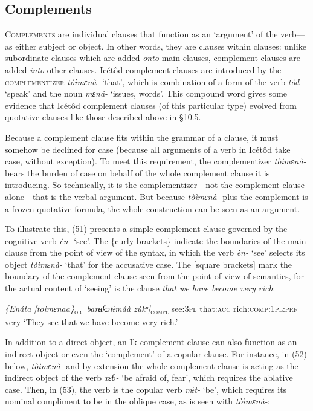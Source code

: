 \subsection{Complements}


\textsc{Complements} are individual clauses that function as an ‘argument’\textsc{} of the verb—as either subject or object. In other words, they are clauses within clauses: unlike subordinate clauses which are added \textit{onto} main clauses, complement clauses are added \textit{into} other clauses. Icétôd complement clauses are introduced by the \textsc{complementizer} \textit{tòìmɛnà-} ‘that’, which is combination of a form of the verb \textit{tód-} ‘speak’ and the noun \textit{mɛná-} ‘issues, words’. This compound word gives some evidence that Icétôd complement clauses (of this particular type) evolved from quotative clauses like those described above in §10.5.

Because a complement clause fits within the grammar of a clause, it must somehow be declined for case (because all arguments of a verb in Icétôd take case, without exception). To meet this requirement, the complementizer \textit{tòìmɛnà-} bears the burden of case on behalf of the whole complement clause it is introducing. So technically, it is the complementizer—not the complement clause alone—that is the verbal argument. But because \textit{tòìmɛnà-} plus the complement is a frozen quotative formula, the whole construction can be seen as an argument.

To illustrate this, (51) presents a simple complement clause governed by the cognitive verb \textit{èn-} ‘see’. The \{curly brackets\} indicate the boundaries of the main clause from the point of view of the syntax, in which the verb \textit{èn-} ‘see’ selects its object \textit{tòìmɛnà-} ‘that’ for the accusative case. The [square brackets] mark the boundary of the complement clause seen from the point of view of semantics, for the actual content of ‘seeing’ is the clause \textit{that we have become very rich}:




\textit{\{Enáta  [toimɛnaa\}}\textsc{\textsubscript{obj}}\textit{ barʉƙɔtɨmáà   zùkᵘ]}\textsc{\textsubscript{compl}}
see:\textsc{3pl}   that:\textsc{acc}    rich:\textsc{comp:1pl:prf}   very
‘They see that we have become very rich.’


In addition to a direct object, an Ik complement clause can also function as an indirect object or even the ‘complement’ of a copular clause. For instance, in (52) below, \textit{tòìmɛnà-} and by extension the whole complement clause is acting as the indirect object of the verb \textit{xɛɓ-} ‘be afraid of, fear’, which requires the ablative case. Then, in (53), the verb is the copular verb \textit{mɨt-} ‘be’, which requires its nominal compliment to be in the oblique case, as is seen with \textit{tòìmɛnà-}:



